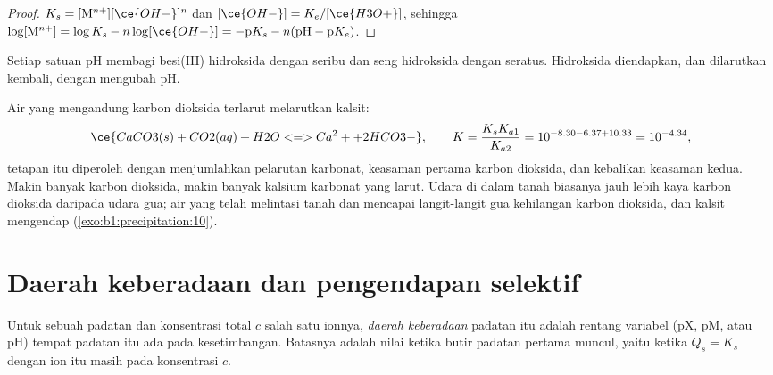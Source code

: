 \begin{proof}
$K_s = [\mathrm{M}^{n+}][\ce{OH-}]^n$ dan $[\ce{OH-}] = K_e/[\ce{H3O+}]$,
sehingga $\log[\mathrm{M}^{n+}] = \log K_s - n\log[\ce{OH-}] = -\mathrm{p}K_s -
n(\mathrm{pH} - \mathrm{p}K_e)$.
\end{proof}

Setiap satuan pH membagi  besi(III) hidroksida dengan seribu dan
 seng hidroksida dengan seratus. Hidroksida diendapkan, dan
dilarutkan kembali, dengan mengubah pH.

\begin{example}\label{ex:b1:precipitation:cave}
Air yang mengandung karbon dioksida terlarut melarutkan kalsit:
\[
  \ce{CaCO3(s) + CO2(aq) + H2O <=> Ca^2+ + 2HCO3-}, \qquad
  K = \frac{K_s K_{a1}}{K_{a2}} = 10^{-8.30 - 6.37 + 10.33} = 10^{-4.34} ,
\]
tetapan itu diperoleh dengan menjumlahkan pelarutan karbonat, keasaman
pertama karbon dioksida, dan kebalikan keasaman kedua. Makin banyak
karbon dioksida, makin banyak kalsium karbonat yang larut. Udara di dalam
tanah biasanya jauh lebih kaya karbon dioksida daripada udara gua; air
yang telah melintasi tanah dan mencapai langit-langit gua kehilangan
karbon dioksida, dan kalsit mengendap (\cref{exo:b1:precipitation:10}).
\end{example}

\section{Daerah keberadaan dan pengendapan selektif}\label{sec:b1:precipitation:domains}

\begin{definition}\label{def:b1:precipitation:existence-domain}
Untuk sebuah padatan dan konsentrasi total $c$ salah satu ionnya,
\emph{daerah keberadaan} padatan itu adalah
rentang variabel (pX, pM, atau pH) tempat padatan itu ada pada
kesetimbangan. Batasnya adalah nilai ketika butir padatan pertama
muncul, yaitu ketika $Q_s = K_s$ dengan ion itu masih pada konsentrasi
$c$.
\end{definition}

